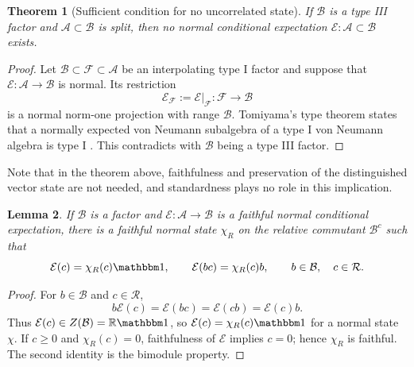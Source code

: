 \documentclass[a4paper,11pt]{article}
\newtheorem{theorem}{Theorem}
\newtheorem{lemma}[theorem]{Lemma}
\theoremstyle{definition}
\newcommand{\mA}{\mathcal{A}}
\newcommand{\mB}{\mathcal{B}}
\newcommand{\mE}{\mathcal{E}}
\begin{document}



\begin{theorem}[Sufficient condition for no uncorrelated state]\label{thm:split-no-expectation}
If $\mB$ is a type III factor and
$\mA\subset \mB$ is split, then no normal conditional expectation
$\mE:\mA\subset \mB$ exists.  
\end{theorem}

\begin{proof}
Let $\mB\subset\mathcal F\subset\mA$ be an interpolating type I
factor and suppose that $\mE:\mA\to \mB$ is normal.  Its restriction
\begin{equation}
 \mE_{\mathcal F}:=\mE|_{\mathcal F}:\mathcal F\longrightarrow\mB
\end{equation}
is a normal norm-one projection with range $\mathcal B$.  Tomiyama's type
theorem states that a normally expected von Neumann subalgebra of a type I von
Neumann algebra is type I \cite{Tomiyama1959}\cite{Takesaki1972}. This contradicts
with $\mB$ being a type III factor.
\end{proof}

Note that in the theorem above, faithfulness and preservation of the
distinguished vector state are not needed, and 
standardness plays no role in this implication.

\begin{lemma}\label{lem:expectation-slice}
If $\mathcal B$ is a factor and $\mE:\mathcal A\to\mathcal B$ is a faithful
normal conditional expectation, there is a faithful normal state $\chi_R$ on
the relative commutant $\mB^c$ such that
\begin{equation}
 \mE(c)=\chi_R(c)\mathbbm 1,
 \qquad \mE(b c)=\chi_R(c)b,
 \qquad b\in\mathcal B,\quad c\in\mathcal R.
\end{equation}
\end{lemma}

\begin{proof}
For $b\in\mathcal B$ and $c\in\mathcal R$,
\begin{equation}
 b \mE(c)=\mE(b c)=\mE(c b)=\mE(c)b.
\end{equation}
Thus $\mE(c)\in Z(\mathcal B)=\mathbb R\mathbbm 1$, so
$\mE(c)=\chi_R(c)\mathbbm 1$ for a normal state $\chi$.  If $c\geq0$ and
$\chi_R(c)=0$, faithfulness of $\mE$ implies $c=0$; hence $\chi_R$ is faithful.  The
second identity is the bimodule property.
\end{proof}
\end{document}
